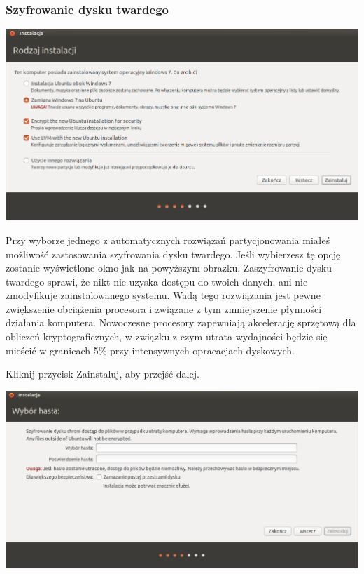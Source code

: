 \subsubsection{Szyfrowanie dysku twardego}
\begin{center}
        \includegraphics[width=\linewidth]{images/instalator_partycjonowanie_szyfrowanie1.png}
\end{center}

Przy wyborze jednego z automatycznych rozwiązań partycjonowania miałeś możliwość zastosowania szyfrowania dysku twardego. Jeśli wybierzesz tę opcję zostanie wyświetlone okno jak na powyższym obrazku. Zaszyfrowanie dysku twardego sprawi, że nikt nie uzyska dostępu do twoich danych, ani nie zmodyfikuje zainstalowanego systemu. Wadą tego rozwiązania jest pewne zwiększenie obciążenia procesora i związane z tym zmniejszenie płynności działania komputera. Nowoczesne procesory zapewniają akcelerację sprzętową dla obliczeń kryptograficznych, w związku z czym utrata wydajności będzie się mieścić w granicach 5\% przy intensywnych opracacjach dyskowych.
\begin{flushright}
Kliknij przycisk \textcolor{ubuntu_orange}{Zainstaluj}, aby przejść dalej.
\end{flushright}
\clearpage
\begin{center}
        \includegraphics[width=\linewidth]{images/instalator_partycjonowanie_szyfrowanie2.png}
\end{center}

